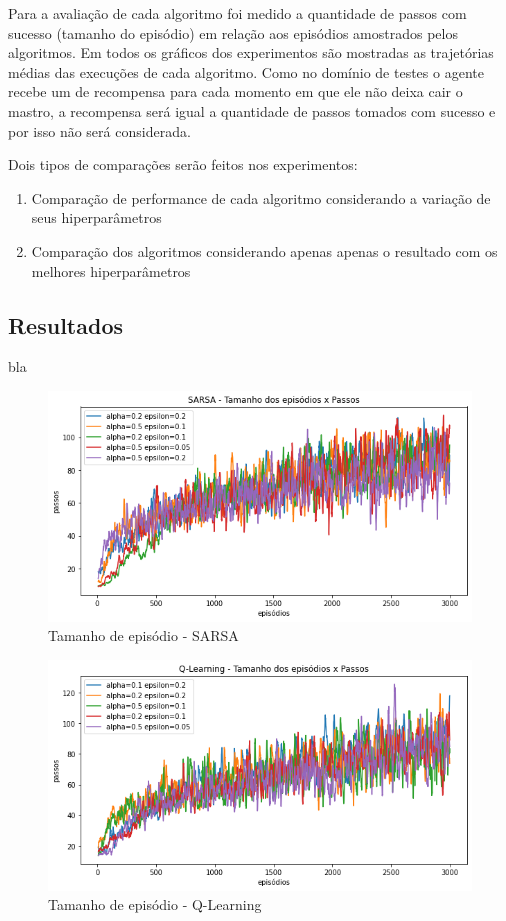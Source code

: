 \documentclass[letterpaper]{article}
\begin{document}
Para a avaliação de cada algoritmo foi medido a quantidade de passos com sucesso (tamanho do episódio) em relação aos episódios amostrados pelos algoritmos. Em todos os gráficos dos experimentos são mostradas as trajetórias médias das execuções de cada algoritmo. Como no domínio de testes o agente recebe um de recompensa para cada momento em que ele não deixa cair o mastro, a recompensa será igual a quantidade de passos tomados com sucesso e por isso não será considerada.

Dois tipos de comparações serão feitos nos experimentos:
\begin{enumerate}
  \item Comparação de performance de cada algoritmo considerando a variação de seus hiperparâmetros
  \item Comparação dos algoritmos considerando apenas apenas o resultado com os melhores hiperparâmetros
\end{enumerate}

\subsection{Resultados}


bla

\begin{figure}[t]
  \centering
  \includegraphics[width=0.9\columnwidth]{exp-sarsa-episodes}
  \caption{Tamanho de episódio - SARSA}
  \label{fig:exp-sarsa-episodes}
\end{figure}

\begin{figure}[t]
  \centering
  \includegraphics[width=0.9\columnwidth]{exp-qlearning-episodes}
  \caption{Tamanho de episódio - Q-Learning}
  \label{fig:exp-qlearning-episodes}
\end{figure}
\end{document}
